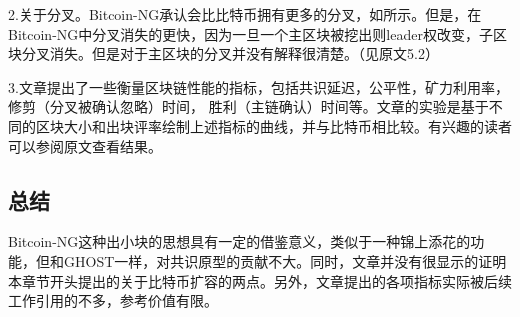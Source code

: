 2.关于分叉。Bitcoin-NG承认会比比特币拥有更多的分叉，如所示。但是，在Bitcoin-NG中分叉消失的更快，因为一旦一个主区块被挖出则leader权改变，子区块分叉消失。但是对于主区块的分叉并没有解释很清楚。（见原文5.2）

3.文章提出了一些衡量区块链性能的指标，包括共识延迟，公平性，矿力利用率，修剪（分叉被确认忽略）时间，	胜利（主链确认）时间等。文章的实验是基于不同的区块大小和出块评率绘制上述指标的曲线，并与比特币相比较。有兴趣的读者可以参阅原文查看结果。

\subsection{总结}
Bitcoin-NG这种出小块的思想具有一定的借鉴意义，类似于一种锦上添花的功能，但和GHOST一样，对共识原型的贡献不大。同时，文章并没有很显示的证明本章节开头提出的关于比特币扩容的两点。另外，文章提出的各项指标实际被后续工作引用的不多，参考价值有限。

